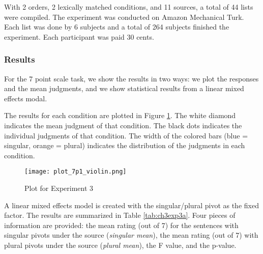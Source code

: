 \documentclass[
  11pt          %
  ,letterpaper  %
  ,center       %
  ,noupper      %
  ]{uconnthesis2}
\begin{document}
With 2 orders, 2 lexically matched conditions, and 11 sources, a total of 44 lists were compiled. The experiment was conducted on Amazon Mechanical Turk. Each list was done by 6 subjects and a total of 264 subjects finished the experiment. Each participant was paid 30 cents. 

\subsubsection{Results}

For the 7 point scale task, we show the results in two ways: we plot the responses and the mean judgments, and we show statistical results from a linear mixed effects modal. 

The results for each condition are plotted in Figure \ref{fig:ch3exp3.violin}. The white diamond indicates the mean judgment of that condition. The black dots indicates the individual judgments of that condition. The width of the colored bars (blue = singular, orange = plural) indicates the distribution of the judgments in each condition. %

\begin{figure}[h!] 
\texttt{[image: plot\_7p1\_violin.png]} \centering
\caption{Plot for Experiment 3}
\label{fig:ch3exp3.violin}
\end{figure}

\vspace{-0.5em}
A linear mixed effects model is created with the singular/plural pivot as the fixed factor. The results are summarized in Table \ref{tab:ch3exp3a}. Four pieces of information are provided: the mean rating (out of 7) for the sentences with singular pivots under the source (\textit{singular mean}), the mean rating (out of 7) with plural pivots under the source (\textit{plural mean}), the F value, and the p-value.
\end{document}
